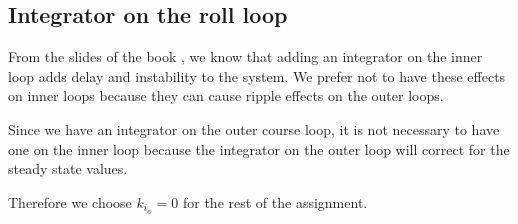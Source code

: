 \subsection{Integrator on the roll loop}

From the slides of the book \cite{beard}, we know that adding an integrator on the inner loop adds delay and instability to the system. We prefer not to have these effects on inner loops because they can cause ripple effects on the outer loops. 

Since we have an integrator on the outer course loop, it is not necessary to have one on the inner loop because the integrator on the outer loop will correct for the steady state values.

Therefore we choose $k_{i_\phi} = 0$ for the rest of the assignment.